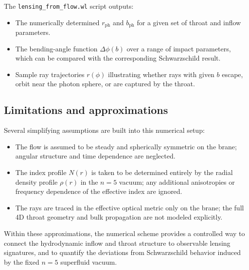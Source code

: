 \documentclass[11pt]{article}
\begin{document}
The \texttt{lensing\_from\_flow.wl} script outputs:
\begin{itemize}
  \item The numerically determined \(r_{\text{ph}}\) and \(b_{\text{ph}}\)
        for a given set of throat and inflow parameters.
  \item The bending-angle function \(\Delta\phi(b)\) over a range of
        impact parameters, which can be compared with the corresponding
        Schwarzschild result.
  \item Sample ray trajectories \(r(\phi)\) illustrating whether rays with
        given \(b\) escape, orbit near the photon sphere, or are captured
        by the throat.
\end{itemize}

\subsection{Limitations and approximations}
\label{app:lensing-limitations}

Several simplifying assumptions are built into this numerical setup:
\begin{itemize}
  \item The flow is assumed to be steady and spherically symmetric on the
        brane; angular structure and time dependence are neglected.
  \item The index profile \(N(r)\) is taken to be determined entirely by
        the radial density profile \(\rho(r)\) in the \(n=5\) vacuum; any
        additional anisotropies or frequency dependence of the effective
        index are ignored.
  \item The rays are traced in the effective optical metric only on the
        brane; the full 4D throat geometry and bulk propagation are not
        modeled explicitly.
\end{itemize}
Within these approximations, the numerical scheme provides a controlled way
to connect the hydrodynamic inflow and throat structure to observable
lensing signatures, and to quantify the deviations from Schwarzschild
behavior induced by the fixed \(n=5\) superfluid vacuum.
\end{document}
